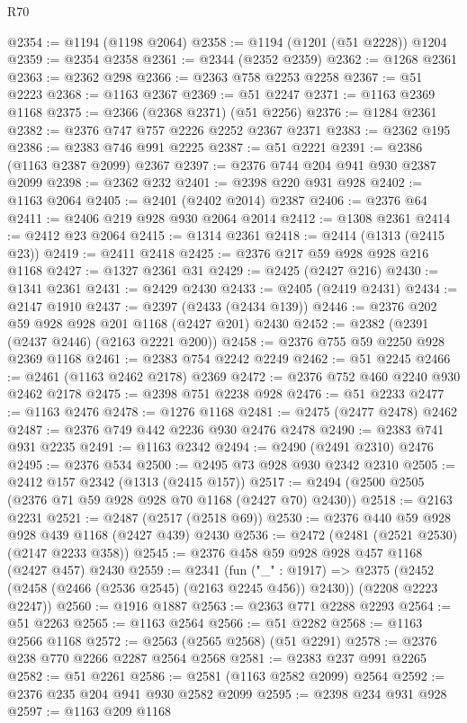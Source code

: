 \begin{lexlean}{R70}
\begin{coremodule}
@2354 := @1194 (@1198 @2064)
@2358 := @1194 (@1201 (@51 @2228)) @1204
@2359 := @2354 @2358
@2361 := @2344 (@2352 @2359)
@2362 := @1268 @2361
@2363 := @2362 @298
@2366 := @2363 @758 @2253 @2258
@2367 := @51 @2223
@2368 := @1163 @2367
@2369 := @51 @2247
@2371 := @1163 @2369 @1168
@2375 := @2366 (@2368 @2371) (@51 @2256)
@2376 := @1284 @2361
@2382 := @2376 @747 @757 @2226 @2252 @2367 @2371
@2383 := @2362 @195
@2386 := @2383 @746 @991 @2225
@2387 := @51 @2221
@2391 := @2386 (@1163 @2387 @2099) @2367
@2397 := @2376 @744 @204 @941 @930 @2387 @2099
@2398 := @2362 @232
@2401 := @2398 @220 @931 @928
@2402 := @1163 @2064
@2405 := @2401 (@2402 @2014) @2387
@2406 := @2376 @64
@2411 := @2406 @219 @928 @930 @2064 @2014
@2412 := @1308 @2361
@2414 := @2412 @23 @2064
@2415 := @1314 @2361
@2418 := @2414 (@1313 (@2415 @23))
@2419 := @2411 @2418
@2425 := @2376 @217 @59 @928 @928 @216 @1168
@2427 := @1327 @2361 @31
@2429 := @2425 (@2427 @216)
@2430 := @1341 @2361
@2431 := @2429 @2430
@2433 := @2405 (@2419 @2431)
@2434 := @2147 @1910
@2437 := @2397 (@2433 (@2434 @139))
@2446 := @2376 @202 @59 @928 @928 @201 @1168 (@2427 @201) @2430
@2452 := @2382 (@2391 (@2437 @2446) (@2163 @2221 @200))
@2458 := @2376 @755 @59 @2250 @928 @2369 @1168
@2461 := @2383 @754 @2242 @2249
@2462 := @51 @2245
@2466 := @2461 (@1163 @2462 @2178) @2369
@2472 := @2376 @752 @460 @2240 @930 @2462 @2178
@2475 := @2398 @751 @2238 @928
@2476 := @51 @2233
@2477 := @1163 @2476
@2478 := @1276 @1168
@2481 := @2475 (@2477 @2478) @2462
@2487 := @2376 @749 @442 @2236 @930 @2476 @2478
@2490 := @2383 @741 @931 @2235
@2491 := @1163 @2342
@2494 := @2490 (@2491 @2310) @2476
@2495 := @2376 @534
@2500 := @2495 @73 @928 @930 @2342 @2310
@2505 := @2412 @157 @2342 (@1313 (@2415 @157))
@2517 := @2494 (@2500 @2505 (@2376 @71 @59 @928 @928 @70 @1168 (@2427 @70) @2430))
@2518 := @2163 @2231
@2521 := @2487 (@2517 (@2518 @69))
@2530 := @2376 @440 @59 @928 @928 @439 @1168 (@2427 @439) @2430
@2536 := @2472 (@2481 (@2521 @2530) (@2147 @2233 @358))
@2545 := @2376 @458 @59 @928 @928 @457 @1168 (@2427 @457) @2430
@2559 := @2341
    (fun ("_" : @1917) =>
    @2375 (@2452 (@2458 (@2466 (@2536 @2545) (@2163 @2245 @456)) @2430)) (@2208 @2223 @2247))
@2560 := @1916 @1887
@2563 := @2363 @771 @2288 @2293
@2564 := @51 @2263
@2565 := @1163 @2564
@2566 := @51 @2282
@2568 := @1163 @2566 @1168
@2572 := @2563 (@2565 @2568) (@51 @2291)
@2578 := @2376 @238 @770 @2266 @2287 @2564 @2568
@2581 := @2383 @237 @991 @2265
@2582 := @51 @2261
@2586 := @2581 (@1163 @2582 @2099) @2564
@2592 := @2376 @235 @204 @941 @930 @2582 @2099
@2595 := @2398 @234 @931 @928
@2597 := @1163 @209 @1168

\end{coremodule}
\end{lexlean}
